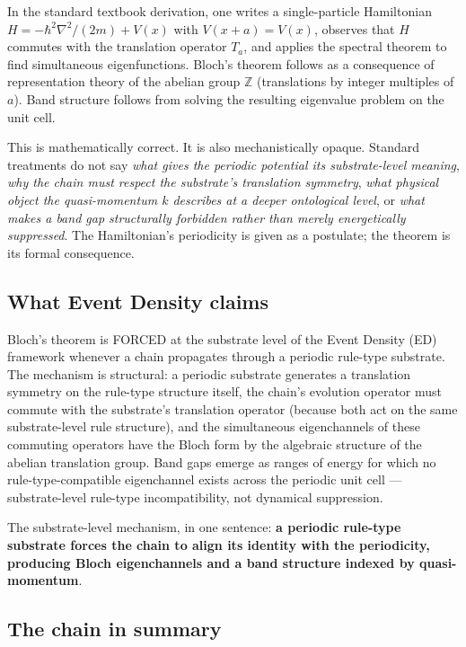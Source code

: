 \documentclass[11pt,a4paper]{article}
\begin{document}
In the standard textbook derivation, one writes a single-particle Hamiltonian $H = -\hbar^2\nabla^2/(2m) + V(x)$ with $V(x+a) = V(x)$, observes that $H$ commutes with the translation operator $T_a$, and applies the spectral theorem to find simultaneous eigenfunctions. Bloch's theorem follows as a consequence of representation theory of the abelian group $\mathbb{Z}$ (translations by integer multiples of $a$). Band structure follows from solving the resulting eigenvalue problem on the unit cell.

This is mathematically correct. It is also mechanistically opaque. Standard treatments do not say \emph{what gives the periodic potential its substrate-level meaning}, \emph{why the chain must respect the substrate's translation symmetry}, \emph{what physical object the quasi-momentum $k$ describes at a deeper ontological level}, or \emph{what makes a band gap structurally forbidden rather than merely energetically suppressed}. The Hamiltonian's periodicity is given as a postulate; the theorem is its formal consequence.

\subsection*{What Event Density claims}

Bloch's theorem is FORCED at the substrate level of the Event Density (ED) framework whenever a chain propagates through a periodic rule-type substrate. The mechanism is structural: a periodic substrate generates a translation symmetry on the rule-type structure itself, the chain's evolution operator must commute with the substrate's translation operator (because both act on the same substrate-level rule structure), and the simultaneous eigenchannels of these commuting operators have the Bloch form by the algebraic structure of the abelian translation group. Band gaps emerge as ranges of energy for which no rule-type-compatible eigenchannel exists across the periodic unit cell --- substrate-level rule-type incompatibility, not dynamical suppression.

The substrate-level mechanism, in one sentence: \textbf{a periodic rule-type substrate forces the chain to align its identity with the periodicity, producing Bloch eigenchannels and a band structure indexed by quasi-momentum}.

\subsection*{The chain in summary}
\end{document}
